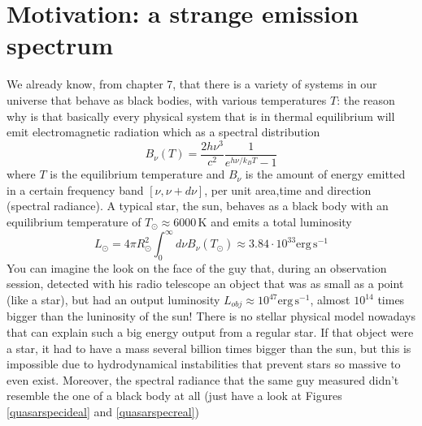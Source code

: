 \documentclass[11pt, a4paper,oneside,openright]{book}
\numberwithin{equation}{section}
\begin{document}
\section{Motivation: a strange emission spectrum}
We already know, from chapter 7, that there is a variety of systems in our universe that behave as black bodies, with various temperatures $T$: the reason why is that basically every physical system that is in thermal equilibrium will emit electromagnetic radiation which as a spectral distribution
\begin{equation}
B_\nu(T) = \frac{2h\nu^3}{c^2}\frac{1}{e^{h\nu/k_BT}-1}
\end{equation} 
where $T$ is the equilibrium temperature and $B_\nu$ is the amount of energy emitted in a certain frequency band $[\nu,\nu+d\nu]$, per unit area,time and direction (spectral radiance). A typical star, the sun, behaves as a black body with an equilibrium temperature of $T_\odot\approx 6000$\,K and emits a total luminosity
\begin{equation}
L_\odot = 4\pi R_\odot^2\int_{0}^\infty d\nu B_\nu(T_\odot)\approx 3.84\cdot 10^{33}\mathrm{erg}\,\mathrm{s}^{-1}
\end{equation}
You can imagine the look on the face of the guy that, during an observation session, detected with his radio telescope an object that was as small as a point (like a star), but had an output luminosity $L_{obj}\approx 10^{47}\mathrm{erg}\,\mathrm{s}^{-1}$, almost $10^{14}$ times bigger than the luninosity of the sun! There is no stellar physical model nowadays that can explain such a big energy output from a regular star. If that object were a star, it had to have a mass several billion times bigger than the sun, but this is impossible due to hydrodynamical instabilities that prevent stars so massive to even exist. Moreover, the spectral radiance that the same guy measured didn't resemble the one of a black body at all (just have a look at Figures \ref{quasarspecideal} and \ref{quasarspecreal})
\end{document}
